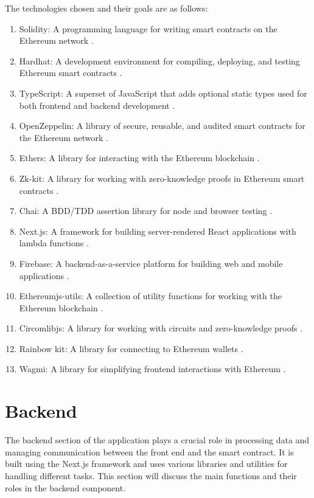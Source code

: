 The technologies chosen and their goals are as follows:
\begin{enumerate}
    \item Solidity: A programming language for writing smart contracts on the Ethereum network \cite{soliditylang}.
    \item Hardhat: A development environment for compiling, deploying, and testing Ethereum smart contracts \cite{hardhat}.
    \item TypeScript: A superset of JavaScript that adds optional static types used for both frontend and backend development \cite{typescript}.
    \item OpenZeppelin: A library of secure, reusable, and audited smart contracts for the Ethereum network \cite{openzeppelin}.
    \item Ethers: A library for interacting with the Ethereum blockchain \cite{ethers}.
    \item Zk-kit: A library for working with zero-knowledge proofs in Ethereum smart contracts \cite{zkkit}.
    \item Chai: A BDD/TDD assertion library for node and browser testing \cite{chaijs}.
    \item Next.js: A framework for building server-rendered React applications with lambda functions \cite{nextjs}.
    \item Firebase: A backend-as-a-service platform for building web and mobile applications \cite{firebase}.
    \item Ethereumjs-utils: A collection of utility functions for working with the Ethereum blockchain \cite{ethereumjs}.
    \item Circomlibjs: A library for working with circuits and zero-knowledge proofs \cite{circomlib}.
    \item Rainbow kit: A library for connecting to Ethereum wallets \cite{rainbow}.
    \item Wagmi: A library for simplifying frontend interactions with Ethereum \cite{wagmi}.
\end{enumerate}


\section{Backend}
The backend section of the application plays a crucial role in processing data and managing communication between the front end and the smart contract. It is built using the Next.js framework and uses various libraries and utilities for handling different tasks. This section will discuss the main functions and their roles in the backend component.

